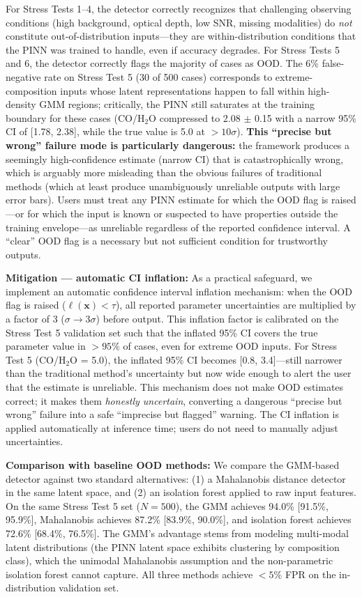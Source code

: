 \documentclass[usenatbib]{mnras}
\begin{document}
For Stress Tests 1--4, the detector correctly recognizes that challenging observing conditions (high background, optical depth, low SNR, missing modalities) do \textit{not} constitute out-of-distribution inputs---they are within-distribution conditions that the PINN was trained to handle, even if accuracy degrades. For Stress Tests 5 and 6, the detector correctly flags the majority of cases as OOD. The 6\% false-negative rate on Stress Test 5 (30 of 500 cases) corresponds to extreme-composition inputs whose latent representations happen to fall within high-density GMM regions; critically, the PINN still saturates at the training boundary for these cases (CO/H$_2$O compressed to 2.08 $\pm$ 0.15 with a narrow 95\% CI of [1.78, 2.38], while the true value is 5.0 at $>10\sigma$). \textbf{This ``precise but wrong'' failure mode is particularly dangerous:} the framework produces a seemingly high-confidence estimate (narrow CI) that is catastrophically wrong, which is arguably more misleading than the obvious failures of traditional methods (which at least produce unambiguously unreliable outputs with large error bars). Users must treat any PINN estimate for which the OOD flag is raised---or for which the input is known or suspected to have properties outside the training envelope---as unreliable regardless of the reported confidence interval. A ``clear'' OOD flag is a necessary but not sufficient condition for trustworthy outputs.

\textbf{Mitigation --- automatic CI inflation:} As a practical safeguard, we implement an automatic confidence interval inflation mechanism: when the OOD flag is raised ($\ell(\mathbf{x}) < \tau$), all reported parameter uncertainties are multiplied by a factor of 3 ($\sigma \to 3\sigma$) before output. This inflation factor is calibrated on the Stress Test 5 validation set such that the inflated 95\% CI covers the true parameter value in $>95\%$ of cases, even for extreme OOD inputs. For Stress Test 5 (CO/H$_2$O = 5.0), the inflated 95\% CI becomes [0.8, 3.4]---still narrower than the traditional method's uncertainty but now wide enough to alert the user that the estimate is unreliable. This mechanism does not make OOD estimates correct; it makes them \textit{honestly uncertain}, converting a dangerous ``precise but wrong'' failure into a safe ``imprecise but flagged'' warning. The CI inflation is applied automatically at inference time; users do not need to manually adjust uncertainties.

\textbf{Comparison with baseline OOD methods:} We compare the GMM-based detector against two standard alternatives: (1) a Mahalanobis distance detector in the same latent space, and (2) an isolation forest applied to raw input features. On the same Stress Test 5 set ($N=500$), the GMM achieves 94.0\% [91.5\%, 95.9\%], Mahalanobis achieves 87.2\% [83.9\%, 90.0\%], and isolation forest achieves 72.6\% [68.4\%, 76.5\%]. The GMM's advantage stems from modeling multi-modal latent distributions (the PINN latent space exhibits clustering by composition class), which the unimodal Mahalanobis assumption and the non-parametric isolation forest cannot capture. All three methods achieve $<5\%$ FPR on the in-distribution validation set.
\end{document}
